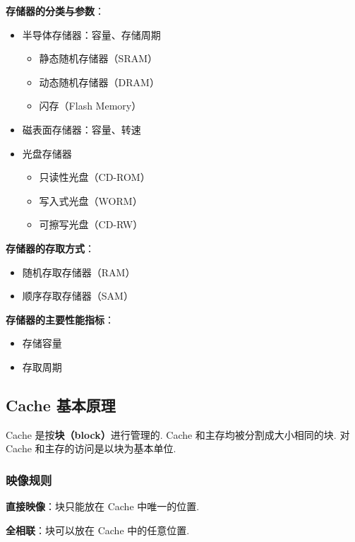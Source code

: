 \documentclass[cn, hazy, blue, normal, 12pt]{elegantnote}
\begin{document}
\textbf{存储器的分类与参数}：

\begin{itemize}
    \item 半导体存储器：容量、存储周期
          \begin{itemize}
              \item 静态随机存储器（SRAM）
              \item 动态随机存储器（DRAM）
              \item 闪存（Flash Memory）
          \end{itemize}
    \item 磁表面存储器：容量、转速
    \item 光盘存储器
          \begin{itemize}
              \item 只读性光盘（CD-ROM）
              \item 写入式光盘（WORM）
              \item 可擦写光盘（CD-RW）
          \end{itemize}
\end{itemize}

\textbf{存储器的存取方式}：

\begin{itemize}
    \item 随机存取存储器（RAM）
    \item 顺序存取存储器（SAM）
\end{itemize}

\textbf{存储器的主要性能指标}：

\begin{itemize}
    \item 存储容量
    \item 存取周期
\end{itemize}

\subsection{Cache 基本原理}

Cache 是按\textbf{块（block）}进行管理的. Cache 和主存均被分割成大小相同的块. 对 Cache 和主存的访问是以块为基本单位.

\subsubsection{映像规则}

\textbf{直接映像}：块只能放在 Cache 中唯一的位置.

\textbf{全相联}：块可以放在 Cache 中的任意位置.
\end{document}
